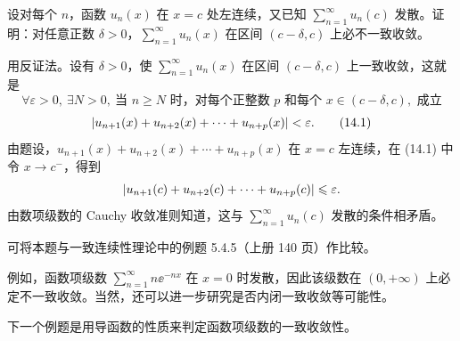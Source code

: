\begin{xexample}[14.1.3]
设对每个 $n$，函数 $u_n(x)$ 在 $x=c$ 处左连续，又已知 $\displaystyle\sum_{n=1}^{\infty}u_n(c)$ 发散。证明：对任意正数 $\delta>0$，$\displaystyle\sum_{n=1}^{\infty}u_n(x)$ 在区间 $(c-\delta,c)$ 上必不一致收敛。
\end{xexample}
\begin{xproof}
用反证法。设有 $\delta>0$，使 $\displaystyle\sum_{n=1}^{\infty}u_n(x)$ 在区间 $(c-\delta,c)$ 上一致收敛，这就是
\[
  \forall\varepsilon>0,\ \exists N>0,\ \text{当 }n\geqslant N\text{ 时，对每个正整数 }p\text{ 和每个 }x\in(c-\delta,c),\text{ 成立}
\]
\begin{equation}
  \lvert u_{n+1}(x)+u_{n+2}(x)+\cdots+u_{n+p}(x)\rvert<\varepsilon.
  \tag{14.1}
  \label{eq:14.1}
\end{equation}
由题设，$u_{n+1}(x)+u_{n+2}(x)+\cdots+u_{n+p}(x)$ 在 $x=c$ 左连续，在 (14.1) 中令 $x\to c^-$，得到
\[
  \lvert u_{n+1}(c)+u_{n+2}(c)+\cdots+u_{n+p}(c)\rvert\leqslant\varepsilon.
\]
由数项级数的 Cauchy 收敛准则知道，这与 $\displaystyle\sum_{n=1}^{\infty}u_n(c)$ 发散的条件相矛盾。
\end{xproof}

\begin{xremark}
可将本题与一致连续性理论中的例题 5.4.5（上册 140 页）作比较。
\end{xremark}

\begin{xremark}
例如，函数项级数 $\displaystyle\sum_{n=1}^{\infty}n\ee^{-nx}$ 在 $x=0$ 时发散，因此该级数在 $(0,+\infty)$ 上必定不一致收敛。当然，还可以进一步研究是否内闭一致收敛等可能性。
\end{xremark}

下一个例题是用导函数的性质来判定函数项级数的一致收敛性。


